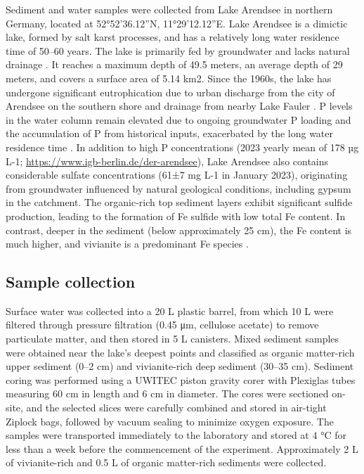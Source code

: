\documentclass[12pt,twoside]{book}
\begin{document}
Sediment and water samples were collected from Lake Arendsee in northern Germany, located at 52°52'36.12''N, 11°29'12.12''E. Lake Arendsee is a dimictic lake, formed by salt karst processes, and has a relatively long water residence time of 50--60 years. The lake is primarily fed by groundwater and lacks natural drainage \citep{Meinikmann2015}. It reaches a maximum depth of 49.5 meters, an average depth of 29 meters, and covers a surface area of 5.14 km2. Since the 1960s, the lake has undergone significant eutrophication due to urban discharge from the city of Arendsee on the southern shore and drainage from nearby Lake Fauler \citep{Scharf1998}. P levels in the water column remain elevated due to ongoing groundwater P loading and the accumulation of P from historical inputs, exacerbated by the long water residence time \citep{Hupfer2019}.
In addition to high P concentrations (2023 yearly mean of 178 µg L-1; \url{https://www.igb-berlin.de/der-arendsee}), Lake Arendsee also contains considerable sulfate concentrations (61±7 mg L-1 in January 2023), originating from groundwater influenced by natural geological conditions, including gypsum in the catchment. The organic-rich top sediment layers exhibit significant sulfide production, leading to the formation of Fe sulfide with low total Fe content. In contrast, deeper in the sediment (below approximately 25 cm), the Fe content is much higher, and vivianite is a predominant Fe species \citep{Rothe2015, Scholtysik2022}.

\subsection{Sample collection}\label{sample-collection}

Surface water was collected into a 20 L plastic barrel, from which 10 L were filtered through pressure filtration (0.45 μm, cellulose acetate) to remove particulate matter, and then stored in 5 L canisters. Mixed sediment samples were obtained near the lake's deepest points and classified as organic matter-rich upper sediment (0--2 cm) and vivianite-rich deep sediment (30--35 cm). Sediment coring was performed using a UWITEC piston gravity corer with Plexiglas tubes measuring 60 cm in length and 6 cm in diameter. The cores were sectioned on-site, and the selected slices were carefully combined and stored in air-tight Ziplock bags, followed by vacuum sealing to minimize oxygen exposure. The samples were transported immediately to the laboratory and stored at 4 °C for less than a week before the commencement of the experiment. Approximately 2 L of vivianite-rich and 0.5 L of organic matter-rich sediments were collected.
\end{document}
